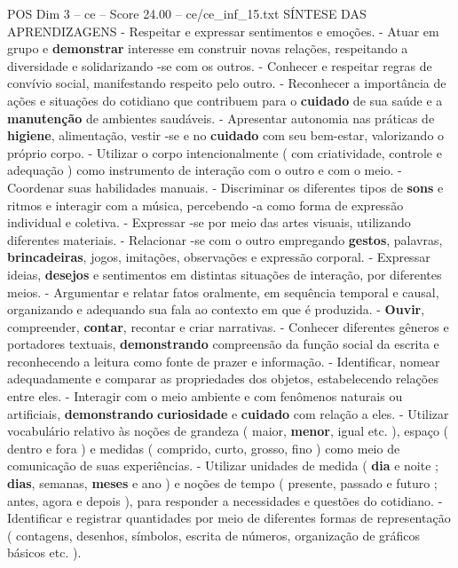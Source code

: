 \begin{textsample}{POS Dim 3 – ce – Score 24.00 – ce/ce\_inf\_15.txt}  \label{ex:f3_pos_057}
SÍNTESE DAS APRENDIZAGENS - Respeitar e expressar sentimentos e emoções. - Atuar em grupo e \textbf{demonstrar} interesse em construir novas relações, respeitando a diversidade e solidarizando -se com os outros. - Conhecer e respeitar regras de convívio social, manifestando respeito pelo outro. - Reconhecer a importância de ações e situações do cotidiano que contribuem para o \textbf{cuidado} de sua saúde e a \textbf{manutenção} de ambientes saudáveis. - Apresentar autonomia nas práticas de \textbf{higiene}, alimentação, vestir -se e no \textbf{cuidado} com seu bem-estar, valorizando o próprio corpo. - Utilizar o corpo intencionalmente ( com criatividade, controle e adequação ) como instrumento de interação com o outro e com o meio. - Coordenar suas habilidades manuais. - Discriminar os diferentes tipos de \textbf{sons} e ritmos e interagir com a música, percebendo -a como forma de expressão individual e coletiva. - Expressar -se por meio das artes visuais, utilizando diferentes materiais. - Relacionar -se com o outro empregando \textbf{gestos}, palavras, \textbf{brincadeiras}, jogos, imitações, observações e expressão corporal. - Expressar ideias, \textbf{desejos} e sentimentos em distintas situações de interação, por diferentes meios. - Argumentar e relatar fatos oralmente, em sequência temporal e causal, organizando e adequando sua fala ao contexto em que é produzida. - \textbf{Ouvir}, compreender, \textbf{contar}, recontar e criar narrativas. - Conhecer diferentes gêneros e portadores textuais, \textbf{demonstrando} compreensão da função social da escrita e reconhecendo a leitura como fonte de prazer e informação. - Identificar, nomear adequadamente e comparar as propriedades dos objetos, estabelecendo relações entre eles. - Interagir com o meio ambiente e com fenômenos naturais ou artificiais, \textbf{demonstrando} \textbf{curiosidade} e \textbf{cuidado} com relação a eles. - Utilizar vocabulário relativo às noções de grandeza ( maior, \textbf{menor}, igual etc. ), espaço ( dentro e fora ) e medidas ( comprido, curto, grosso, fino ) como meio de comunicação de suas experiências. - Utilizar unidades de medida ( \textbf{dia} e noite ; \textbf{dias}, semanas, \textbf{meses} e ano ) e noções de tempo ( presente, passado e futuro ; antes, agora e depois ), para responder a necessidades e questões do cotidiano. - Identificar e registrar quantidades por meio de diferentes formas de representação ( contagens, desenhos, símbolos, escrita de números, organização de gráficos básicos etc. ).

\end{textsample}
